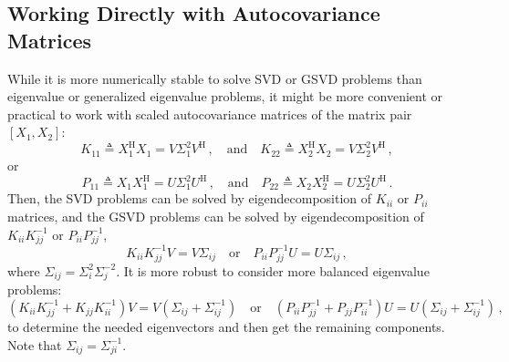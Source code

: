 \documentclass[10pt]{article}
\begin{document}
\subsection{Working Directly with Autocovariance Matrices}\label{3_3}

While it is more numerically stable to solve SVD or GSVD problems than eigenvalue or generalized eigenvalue problems, it might be more convenient or practical to work with scaled autocovariance matrices of the matrix pair $\left[X_1, X_2\right]$:
\begin{equation}
    K_{11} \triangleq X_1^\mathrm{H}X_1 = V \Sigma_{1}^2V^\mathrm{H}\,, \quad \mathrm{and} \quad K_{22} \triangleq X_2^\mathrm{H} X_2 = V\Sigma_{2}^2V^\mathrm{H}\,,
\end{equation}
or
\begin{equation}
    P_{11} \triangleq X_1 X_1^\mathrm{H} = U \Sigma_{1}^2U^\mathrm{H}\,, \quad \mathrm{and} \quad P_{22} \triangleq X_2 X_2^\mathrm{H} = U \Sigma_{2}^2U^\mathrm{H}\,.
\end{equation}
Then, the SVD problems can be solved by eigendecomposition of $K_{ii}$ or $P_{ii}$ matrices, and the GSVD problems can be solved by eigendecomposition of $K_{ii}K_{jj}^{-1}$ or $P_{ii}P_{jj}^{-1}$,
\begin{equation}
    K_{ii}K_{jj}^{-1} V = V \Sigma_{ij} \quad \mathrm{or} \quad P_{ii}P_{jj}^{-1} U = U \Sigma_{ij}\,,
\end{equation}
where $\Sigma_{ij} = \Sigma_{i}^2\Sigma_{j}^{-2}$.
It is more robust to consider more balanced eigenvalue problems:
\begin{equation}
    \left(K_{ii}K_{jj}^{-1} + K_{jj}K_{ii}^{-1}\right) V = V \left(\Sigma_{ij}+\Sigma_{ij}^{-1}\right) \quad \mathrm{or} \quad \left(P_{ii}P_{jj}^{-1} + P_{jj}P_{ii}^{-1}\right) U = U \left(\Sigma_{ij}+\Sigma_{ij}^{-1}\right)\,,
\end{equation}
to determine the needed eigenvectors and then get the remaining components. Note that $\Sigma_{ij}=\Sigma_{ji}^{-1}$.
\end{document}
